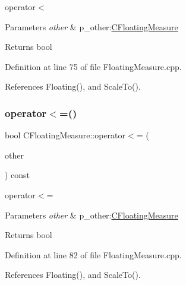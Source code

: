 operator$<$ 


\begin{DoxyParams}{Parameters}
{\em other} & p\+\_\+other\+:\hyperlink{classCFloatingMeasure}{C\+Floating\+Measure} \\
\hline
\end{DoxyParams}
\begin{DoxyReturn}{Returns}
bool 
\end{DoxyReturn}


Definition at line 75 of file Floating\+Measure.\+cpp.



References Floating(), and Scale\+To().

\mbox{\label{classCFloatingMeasure_ad8b94201f5df969de576f89a249c947e}} 
\subsubsection{\texorpdfstring{operator$<$=()}{operator<=()}}
{\footnotesize\ttfamily bool C\+Floating\+Measure\+::operator$<$= (\begin{DoxyParamCaption}\item[{const \hyperlink{classCFloatingMeasure}{C\+Floating\+Measure} \&}]{other }\end{DoxyParamCaption}) const}



operator$<$= 


\begin{DoxyParams}{Parameters}
{\em other} & p\+\_\+other\+:\hyperlink{classCFloatingMeasure}{C\+Floating\+Measure} \\
\hline
\end{DoxyParams}
\begin{DoxyReturn}{Returns}
bool 
\end{DoxyReturn}


Definition at line 82 of file Floating\+Measure.\+cpp.



References Floating(), and Scale\+To().

\mbox{\label{classCFloatingMeasure_a958ef3d71c3dd7355bebef272df5b9e0}} 
